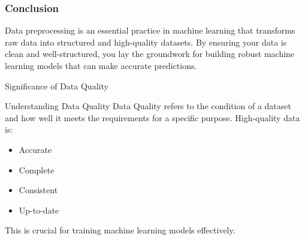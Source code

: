 \documentclass[aspectratio=169]{beamer}
\begin{document}
\begin{frame}[fragile]
    \frametitle{Conclusion}
    Data preprocessing is an essential practice in machine learning that transforms raw data into structured and high-quality datasets. By ensuring your data is clean and well-structured, you lay the groundwork for building robust machine learning models that can make accurate predictions.
\end{frame}

\begin{frame}[fragile]{Significance of Data Quality}
    \begin{block}{Understanding Data Quality}
        Data Quality refers to the condition of a dataset and how well it meets the requirements for a specific purpose. 
        High-quality data is:
        \begin{itemize}
            \item Accurate
            \item Complete
            \item Consistent
            \item Up-to-date
        \end{itemize}
        This is crucial for training machine learning models effectively.
    \end{block}
\end{frame}
\end{document}
